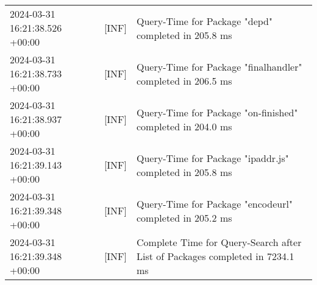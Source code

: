 {{\begin{tabularx}{\textwidth}{|l|l|X|}
                    2024-03-31 16:21:38.526 +00:00 & [INF] & Query-Time for Package "depd" completed in 205.8 ms \\
                    2024-03-31 16:21:38.733 +00:00 & [INF] & Query-Time for Package "finalhandler" completed in 206.5 ms \\
                    2024-03-31 16:21:38.937 +00:00 & [INF] & Query-Time for Package "on-finished" completed in 204.0 ms \\
                    2024-03-31 16:21:39.143 +00:00 & [INF] & Query-Time for Package "ipaddr.js" completed in 205.8 ms \\
                    2024-03-31 16:21:39.348 +00:00 & [INF] & Query-Time for Package "encodeurl" completed in 205.2 ms \\
                    2024-03-31 16:21:39.348 +00:00 & [INF] & Complete Time for Query-Search after List of Packages completed in 7234.1 ms \\
                    \hline
                \end{tabularx}
            }
        }

